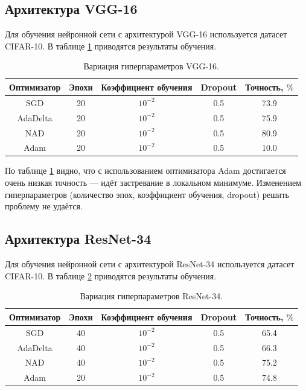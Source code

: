 \documentclass[a4paper, 14pt]{extarticle}
\begin{document}
\subsection{Архитектура VGG-16}

Для обучения нейронной сети с архитектурой VGG-16 используется датасет CIFAR-10. В таблице \ref{table:vgg-16} приводятся результаты обучения.

\begin{table}[h!]
\centering
\begin{tabular}{||c | c | c | c | c||}
 \hline
  Оптимизатор & Эпохи & Коэффициент обучения & Dropout & Точность, $\%$ \\ [0.5ex] 
 \hline\hline
  SGD & 20 & $10^{-2}$ & 0.5 & 73.9 \\ 
 \hline
  AdaDelta & 20 & $10^{-2}$ & 0.5 & 75.9 \\
 \hline
  NAD & 20 & $10^{-2}$ & 0.5 & 80.9 \\
 \hline
  Adam & 20 & $10^{-2}$ & 0.5 & 10.0 \\ [1ex] 
 \hline
\end{tabular}
\caption{Вариация гиперпараметров VGG-16.}
\label{table:vgg-16}
\end{table}

По таблице \ref{table:vgg-16} видно, что с использованием оптимизатора Adam достигается очень низкая точность --- идёт застревание в локальном минимуме.
Изменением гиперпараметров (количество эпох, коэффициент обучения, dropout) решить проблему не удаётся.

\subsection{Архитектура ResNet-34}

Для обучения нейронной сети с архитектурой ResNet-34 используется датасет CIFAR-10. В таблице \ref{table:resnet-34} приводятся результаты обучения.

\begin{table}[h!]
\centering
\begin{tabular}{||c | c | c | c | c||}
 \hline
  Оптимизатор & Эпохи & Коэффициент обучения & Dropout & Точность, $\%$ \\ [0.5ex] 
 \hline\hline
  SGD & 40 & $10^{-2}$ & 0.5 & 65.4 \\ 
 \hline
  AdaDelta & 40 & $10^{-2}$ & 0.5 & 66.3 \\
 \hline
  NAD & 40 & $10^{-2}$ & 0.5 & 75.2 \\
 \hline
  Adam & 20 & $10^{-2}$ & 0.5 & 74.8 \\ [1ex] 
 \hline
\end{tabular}
\caption{Вариация гиперпараметров ResNet-34.}
\label{table:resnet-34}
\end{table}
\end{document}

